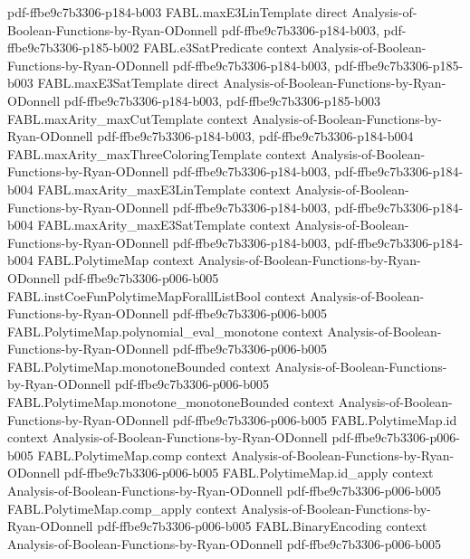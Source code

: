 \begin{theorem}
  {pdf-ffbe9c7b3306-p184-b003}
\proofstep
  {FABL.maxE3LinTemplate}
  {direct}
  {Analysis-of-Boolean-Functions-by-Ryan-ODonnell}
  {pdf-ffbe9c7b3306-p184-b003,
    pdf-ffbe9c7b3306-p185-b002}
\proofstep
  {FABL.e3SatPredicate}
  {context}
  {Analysis-of-Boolean-Functions-by-Ryan-ODonnell}
  {pdf-ffbe9c7b3306-p184-b003,
    pdf-ffbe9c7b3306-p185-b003}
\proofstep
  {FABL.maxE3SatTemplate}
  {direct}
  {Analysis-of-Boolean-Functions-by-Ryan-ODonnell}
  {pdf-ffbe9c7b3306-p184-b003,
    pdf-ffbe9c7b3306-p185-b003}
\proofstep
  {FABL.maxArity_maxCutTemplate}
  {context}
  {Analysis-of-Boolean-Functions-by-Ryan-ODonnell}
  {pdf-ffbe9c7b3306-p184-b003,
    pdf-ffbe9c7b3306-p184-b004}
\proofstep
  {FABL.maxArity_maxThreeColoringTemplate}
  {context}
  {Analysis-of-Boolean-Functions-by-Ryan-ODonnell}
  {pdf-ffbe9c7b3306-p184-b003,
    pdf-ffbe9c7b3306-p184-b004}
\proofstep
  {FABL.maxArity_maxE3LinTemplate}
  {context}
  {Analysis-of-Boolean-Functions-by-Ryan-ODonnell}
  {pdf-ffbe9c7b3306-p184-b003,
    pdf-ffbe9c7b3306-p184-b004}
\proofstep
  {FABL.maxArity_maxE3SatTemplate}
  {context}
  {Analysis-of-Boolean-Functions-by-Ryan-ODonnell}
  {pdf-ffbe9c7b3306-p184-b003,
    pdf-ffbe9c7b3306-p184-b004}
\proofstep
  {FABL.PolytimeMap}
  {context}
  {Analysis-of-Boolean-Functions-by-Ryan-ODonnell}
  {pdf-ffbe9c7b3306-p006-b005}
\proofstep
  {FABL.instCoeFunPolytimeMapForallListBool}
  {context}
  {Analysis-of-Boolean-Functions-by-Ryan-ODonnell}
  {pdf-ffbe9c7b3306-p006-b005}
\proofstep
  {FABL.PolytimeMap.polynomial_eval_monotone}
  {context}
  {Analysis-of-Boolean-Functions-by-Ryan-ODonnell}
  {pdf-ffbe9c7b3306-p006-b005}
\proofstep
  {FABL.PolytimeMap.monotoneBounded}
  {context}
  {Analysis-of-Boolean-Functions-by-Ryan-ODonnell}
  {pdf-ffbe9c7b3306-p006-b005}
\proofstep
  {FABL.PolytimeMap.monotone_monotoneBounded}
  {context}
  {Analysis-of-Boolean-Functions-by-Ryan-ODonnell}
  {pdf-ffbe9c7b3306-p006-b005}
\proofstep
  {FABL.PolytimeMap.id}
  {context}
  {Analysis-of-Boolean-Functions-by-Ryan-ODonnell}
  {pdf-ffbe9c7b3306-p006-b005}
\proofstep
  {FABL.PolytimeMap.comp}
  {context}
  {Analysis-of-Boolean-Functions-by-Ryan-ODonnell}
  {pdf-ffbe9c7b3306-p006-b005}
\proofstep
  {FABL.PolytimeMap.id_apply}
  {context}
  {Analysis-of-Boolean-Functions-by-Ryan-ODonnell}
  {pdf-ffbe9c7b3306-p006-b005}
\proofstep
  {FABL.PolytimeMap.comp_apply}
  {context}
  {Analysis-of-Boolean-Functions-by-Ryan-ODonnell}
  {pdf-ffbe9c7b3306-p006-b005}
\proofstep
  {FABL.BinaryEncoding}
  {context}
  {Analysis-of-Boolean-Functions-by-Ryan-ODonnell}
  {pdf-ffbe9c7b3306-p006-b005}
\proofstep

\end{theorem}
